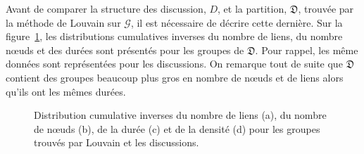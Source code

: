 Avant de comparer la structure des discussion, $D$, et la partition, $\mathfrak{D}$, trouvée par la méthode de Louvain sur $\mathcal{G}$, il est nécessaire de décrire cette dernière.
Sur la figure~\ref{fig:carac_mail_louvain}, les distributions cumulatives inverses du nombre de liens, du nombre n\oe uds et des durées sont présentés pour les groupes de $\mathfrak{D}$.
Pour rappel, les même données  sont représentées pour les discussions.
On remarque tout de suite que $\mathfrak{D}$ contient des groupes beaucoup plus gros  en nombre de n\oe uds et de liens alors qu'ils ont les mêmes durées.
\begin{figure}[]
\centering

\hfill
{}\hfill

\hfill
{}
\caption{Distribution cumulative inverses du nombre de liens (a), du nombre de n\oe uds (b), de la durée (c) et de la densité (d) pour les groupes trouvés par Louvain et les discussions.}
\label{fig:carac_mail_louvain}
\end{figure}

